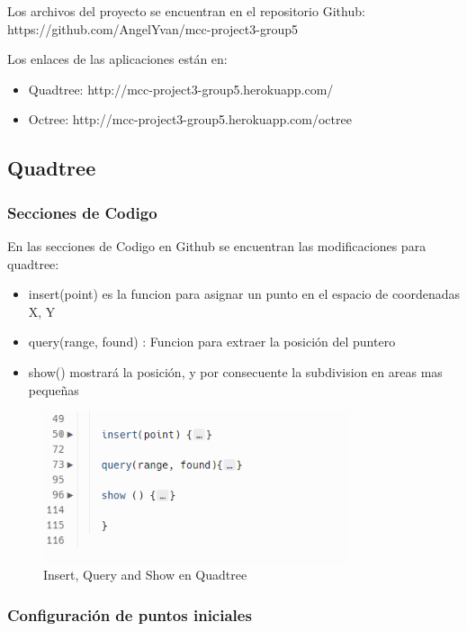 \documentclass{article}
\begin{document}
Los archivos del proyecto se encuentran en el repositorio Github: https://github.com/AngelYvan/mcc-project3-group5

Los enlaces  de las aplicaciones están en:

\begin{itemize}
    \item Quadtree: http://mcc-project3-group5.herokuapp.com/
    \item Octree: http://mcc-project3-group5.herokuapp.com/octree
\end{itemize}

\subsection{Quadtree}
\subsubsection{Secciones de Codigo}

En las secciones de Codigo en Github se encuentran las modificaciones para quadtree:

\begin{itemize}
    \item insert(point) es la funcion para asignar un punto en el espacio de coordenadas X, Y
    \item query(range, found) : Funcion  para extraer la posición del puntero
    \item show() mostrará la posición, y por consecuente la subdivision en areas mas pequeñas
\end{itemize}


\begin{figure}[H]
\centering
\includegraphics[width=0.8\textwidth]{img/quad_insertque.png}
\caption{Insert, Query and Show en Quadtree}
\end{figure}

\subsubsection{Configuración de puntos iniciales}
\end{document}
